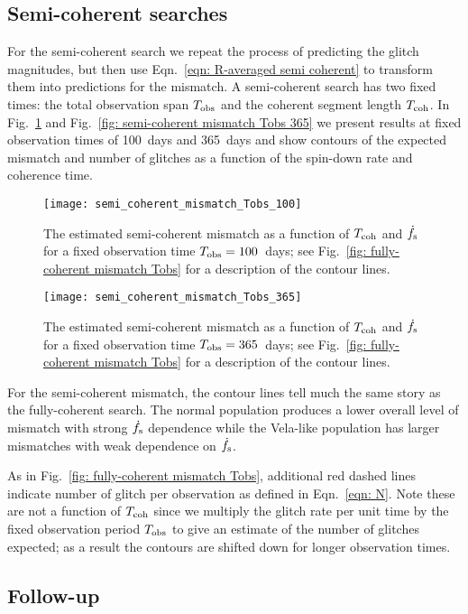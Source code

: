 \documentclass[../full_thesis/full_thesis.tex]{subfiles}
\begin{document}
\subsection{Semi-coherent searches}

For the semi-coherent search we repeat the process of predicting the glitch
magnitudes, but then use Eqn.~\eqref{eqn: R-averaged semi coherent} to
transform them into predictions for the mismatch. A semi-coherent search has two
fixed times: the total observation span $T_{\mathrm{obs}}$ and the coherent segment length
$T_{\mathrm{coh}}$. In Fig.~\ref{fig: semi-coherent mismatch Tobs 100} and Fig.~\ref{fig:
semi-coherent mismatch Tobs 365} we present results at fixed observation times
of 100~days and 365~days and show contours of the expected mismatch and number
of glitches as a function of the spin-down rate and coherence time.
\begin{figure}
\centering
\texttt{[image: semi\_coherent\_mismatch\_Tobs\_100]}
\caption{
The estimated semi-coherent mismatch as a function of $T_{\mathrm{coh}}$ and $\dot{f}_{\textrm{s}}$ for
a fixed observation time $T_{\mathrm{obs}}=100$~days; see Fig.~\ref{fig: fully-coherent
mismatch Tobs} for a description of the contour lines.}
\label{fig: semi-coherent mismatch Tobs 100}
\end{figure}
\begin{figure}
\centering
\texttt{[image: semi\_coherent\_mismatch\_Tobs\_365]}
\caption{
The estimated semi-coherent mismatch as a function of $T_{\mathrm{coh}}$ and $\dot{f}_{\textrm{s}}$ for
a fixed observation time $T_{\mathrm{obs}}=365$~days; see Fig.~\ref{fig: fully-coherent
mismatch Tobs} for a description of the contour lines.}
\label{fig: semi-coherent mismatch Tobs 365}
\end{figure}

For the semi-coherent mismatch, the contour lines tell much the same story as
the fully-coherent search. The normal population produces a lower overall level of
mismatch with strong $\dot{f}_{\textrm{s}}$ dependence while the Vela-like population has
larger mismatches with weak dependence on $\dot{f}_{\textrm{s}}$.

As in Fig.~\ref{fig: fully-coherent mismatch Tobs}, additional red dashed lines
indicate  number of glitch per observation as defined in Eqn.~\eqref{eqn: N}.
Note these are not a function of $T_{\mathrm{coh}}$ since we multiply the glitch rate per
unit time by the fixed observation period $T_{\mathrm{obs}}$ to give an estimate of the
number of glitches expected; as a result the contours are shifted down for
longer observation times.

\subsection{Follow-up}
\end{document}
